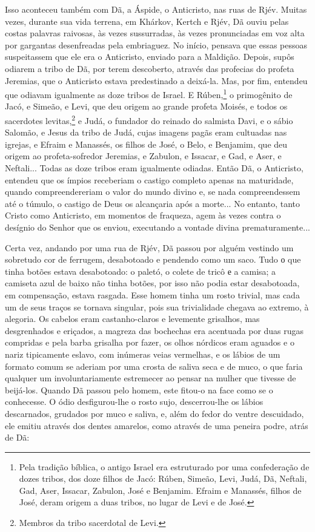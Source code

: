 Isso aconteceu também com Dã, a Áspide, o Anticristo, nas ruas de Rjév.
Muitas vezes, durante sua vida terrena, em Khárkov, Kertch e Rjév, Dã
ouviu pelas costas palavras raivosas, às vezes sussurradas, às vezes
pronunciadas em voz alta por gargantas desenfreadas pela embriaguez. No
início, pensava que essas pessoas suspeitassem que ele era o Anticristo,
enviado para a Maldição. Depois, supôs odiarem a tribo de Dã, por terem
descoberto, através das profecias do profeta Jeremias, que o Anticristo
estava predestinado a deixá-la. Mas, por fim, entendeu que odiavam
igualmente as doze tribos de Israel. E Rúben,\footnote{Pela tradição
  bíblica, o antigo Israel era estruturado por uma confederação de dozes
  tribos, dos doze filhos de Jacó: Rúben, Simeão, Levi, Judá, Dã,
  Neftali, Gad, Aser, Issacar, Zabulon, José e Benjamim. Efraim e
  Manassés, filhos de José, deram origem a duas tribos, no lugar de Levi
  e de José.} o primogênito de Jacó, e Simeão, e Levi, que deu origem ao
grande profeta Moisés, e todos os sacerdotes levitas,\footnote{Membros
  da tribo sacerdotal de Levi.} e Judá, o fundador do reinado do
salmista Davi, e o sábio Salomão, e Jesus da tribo de Judá, cujas
imagens pagãs eram cultuadas nas igrejas, e Efraim e Manassés, os filhos
de José, o Belo, e Benjamim, que deu origem ao profeta-sofredor
Jeremias, e Zabulon, e Issacar, e Gad, e Aser, e Neftali... Todas as
doze tribos eram igualmente odiadas. Então Dã, o Anticristo, entendeu
que os ímpios receberiam o castigo completo apenas na maturidade, quando
compreendereriam o valor do mundo divino e, se nada compreendessem até o
túmulo, o castigo de Deus os alcançaria após a morte... No entanto,
tanto Cristo como Anticristo, em momentos de fraqueza, agem às vezes
contra o desígnio do Senhor que os enviou, executando a vontade divina
prematuramente...

Certa vez, andando por uma rua de Rjév, Dã passou por alguém vestindo um
sobretudo cor de ferrugem, desabotoado e pendendo como um saco. Tudo о
que tinha botões estava desabotoado: o paletó, o colete de tricô е a
camisa; a camiseta azul de baixo não tinha botões, por isso não podia
estar desabotoada, em compensação, estava rasgada. Esse homem tinha um
rosto trivial, mas cada um de seus traços se tornava singular, pois sua
trivialidade chegava ao extremo, à alegoria. Os cabelos eram
castanho-claros e levemente grisalhos, mas desgrenhados e eriçados, a
magreza das bochechas era acentuada por duas rugas compridas e pela
barba grisalha por fazer, os olhos nórdicos eram aguados e o nariz
tipicamente eslavo, com inúmeras veias vermelhas, e os lábios de um
formato comum se aderiam por uma crosta de saliva seca e de muco, o que
faria qualquer um involuntariamente estremecer ao pensar na mulher que
tivesse de beijá-los. Quando Dã passou pelo homem, este fitou-o na face
como se o conhecesse. O ódio desfigurou-lhe o rosto sujo, descerrou-lhe
os lábios descarnados, grudados por muco e saliva, e, além do fedor do
ventre descuidado, ele emitiu através dos dentes amarelos, como através
de uma peneira podre, atrás de Dã:

